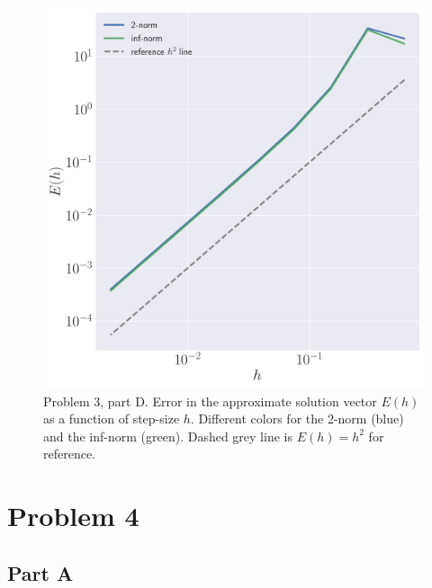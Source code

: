 \documentclass[12pt]{article}
\begin{document}
\begin{figure}[!h]
	\centering
	\includegraphics[clip, scale=0.40]{q3d_fig.pdf}
	\caption{
		Problem 3, part D. Error in the approximate solution vector $E(h)$ as a function of step-size $h$. Different colors for the 2-norm (blue) and the inf-norm (green). Dashed grey line is $E(h) = h^{2}$ for reference.
	}
\end{figure}

\FloatBarrier

\section*{Problem 4}

\subsection*{Part A}
\end{document}
